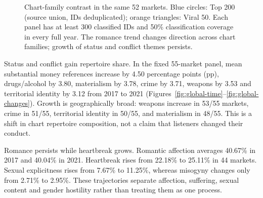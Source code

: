 \documentclass[10pt,a4paper,twocolumn]{article}
\begin{document}
\begin{figure}[t]
\centering{}
\caption{Chart-family contrast in the same 52 markets. Blue circles: Top 200 (source union, IDs deduplicated); orange triangles: Viral 50. Each panel has at least 300 classified IDs and 50\% classification coverage in every full year. The romance trend changes direction across chart families; growth of status and conflict themes persists.}
\label{fig:family-trends}
\end{figure}

Status and conflict gain repertoire share. In the fixed 55-market panel, mean substantial money references increase by 4.50 percentage points (pp), drugs/alcohol by 3.80, materialism by 3.78, crime by 3.71, weapons by 3.53 and territorial identity by 3.12 from 2017 to 2021 (Figures~\ref{fig:global-time}--\ref{fig:global-changes}). Growth is geographically broad: weapons increase in 53/55 markets, crime in 51/55, territorial identity in 50/55, and materialism in 48/55. This is a shift in chart repertoire composition, not a claim that listeners changed their conduct.

Romance persists while heartbreak grows. Romantic affection averages 40.67\% in 2017 and 40.04\% in 2021. Heartbreak rises from 22.18\% to 25.11\% in 44 markets. Sexual explicitness rises from 7.67\% to 11.25\%, whereas misogyny changes only from 2.71\% to 2.95\%. These trajectories separate affection, suffering, sexual content and gender hostility rather than treating them as one process.
\end{document}
